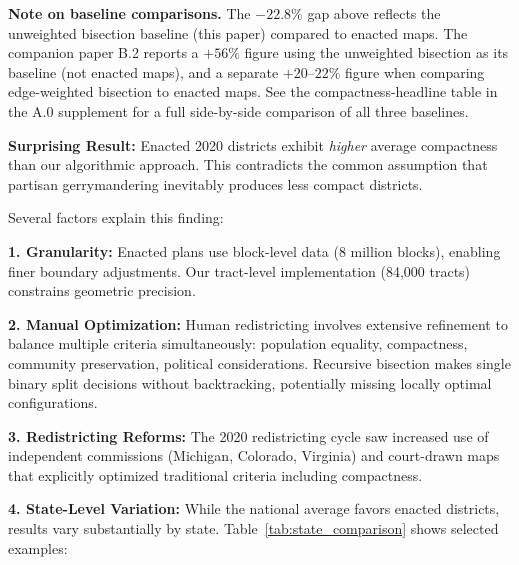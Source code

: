 \noindent\textbf{Note on baseline comparisons.} The $-22.8\%$ gap above reflects the unweighted bisection baseline (this paper) compared to enacted maps. The companion paper B.2 reports a $+56\%$ figure using the unweighted bisection as its baseline (not enacted maps), and a separate $+20$--$22\%$ figure when comparing edge-weighted bisection to enacted maps. See the compactness-headline table in the A.0 supplement for a full side-by-side comparison of all three baselines.

\textbf{Surprising Result:} Enacted 2020 districts exhibit \textit{higher} average compactness than our algorithmic approach. This contradicts the common assumption that partisan gerrymandering inevitably produces less compact districts.

Several factors explain this finding:

\textbf{1. Granularity:} Enacted plans use block-level data (8 million blocks), enabling finer boundary adjustments. Our tract-level implementation (84,000 tracts) constrains geometric precision.

\textbf{2. Manual Optimization:} Human redistricting involves extensive refinement to balance multiple criteria simultaneously: population equality, compactness, community preservation, political considerations. Recursive bisection makes single binary split decisions without backtracking, potentially missing locally optimal configurations.

\textbf{3. Redistricting Reforms:} The 2020 redistricting cycle saw increased use of independent commissions (Michigan, Colorado, Virginia) and court-drawn maps that explicitly optimized traditional criteria including compactness.

\textbf{4. State-Level Variation:} While the national average favors enacted districts, results vary substantially by state. Table~\ref{tab:state_comparison} shows selected examples:


